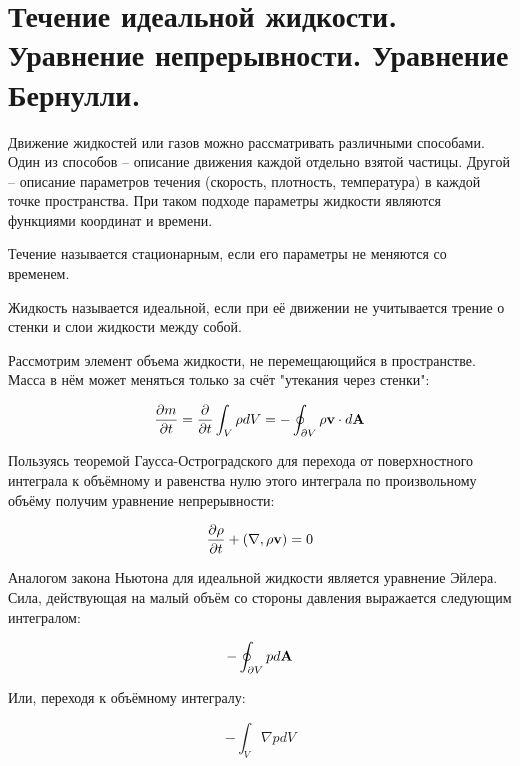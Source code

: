 \section{Течение идеальной жидкости. Уравнение непрерывности. Уравнение Бернулли.}

Движение жидкостей или газов можно рассматривать различными способами. Один из способов -- описание движения каждой отдельно взятой частицы. Другой -- описание параметров течения (скорость, плотность, температура) в каждой точке пространства. При таком подходе параметры жидкости являются функциями координат и времени.

\begin{definition}
    Течение называется стационарным, если его параметры не меняются со временем.
\end{definition}

\begin{definition}
    Жидкость называется идеальной, если при её движении не учитывается трение о стенки и слои жидкости между собой.
\end{definition}

Рассмотрим элемент объема жидкости, не перемещающийся в пространстве. Масса в нём может меняться только за счёт "утекания через стенки":

\begin{equation*}
    \frac{\partial m}{\partial t} = \frac{\partial}{\partial t} \int_V \rho dV = - \oint_{\partial V} \rho \mathbf v \cdot d \mathbf A
\end{equation*}

\noindent
Пользуясь теоремой Гаусса-Остроградского для перехода от поверхностного интеграла к объёмному и равенства нулю этого интеграла по произвольному объёму получим уравнение непрерывности:

\begin{equation} \label{eq:уравнение непрерывности}
    \frac{\partial \rho}{\partial t} + \left( \nabla, \rho \mathbf v \right) = 0
\end{equation}

Аналогом закона Ньютона для идеальной жидкости является уравнение Эйлера. Сила, действующая на малый объём со стороны давления выражается следующим интегралом:

\begin{equation*}
    - \oint_{\partial V} p d \mathbf A
\end{equation*}

\noindent
Или, переходя к объёмному интегралу:

\begin{equation*}
    - \int_V \nabla p dV
\end{equation*}

